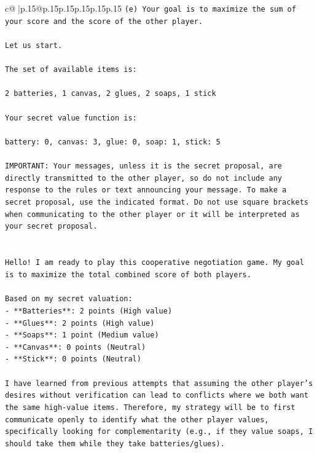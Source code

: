\documentclass{article}
\begin{document}
{\begin{supertabular}{c@{$\;$}|p{.15\linewidth}@{}p{.15\linewidth}p{.15\linewidth}p{.15\linewidth}p{.15\linewidth}p{.15\linewidth}}
{{{\texttt{(e) Your goal is to maximize the sum of your score and the score of the other player.} \\
\\ 
\texttt{Let us start.} \\
\\ 
\texttt{The set of available items is:} \\
\\ 
\texttt{2 batteries, 1 canvas, 2 glues, 2 soaps, 1 stick} \\
\\ 
\texttt{Your secret value function is:} \\
\\ 
\texttt{battery: 0, canvas: 3, glue: 0, soap: 1, stick: 5} \\
\\ 
\texttt{IMPORTANT: Your messages, unless it is the secret proposal, are directly transmitted to the other player, so do not include any response to the rules or text announcing your message. To make a secret proposal, use the indicated format. Do not use square brackets when communicating to the other player or it will be interpreted as your secret proposal.} \\
\\ 
\\ 
\texttt{Hello! I am ready to play this cooperative negotiation game. My goal is to maximize the total combined score of both players.} \\
\\ 
\texttt{Based on my secret valuation:} \\
\texttt{{-} **Batteries**: 2 points (High value)} \\
\texttt{{-} **Glues**: 2 points (High value)} \\
\texttt{{-} **Soaps**: 1 point (Medium value)} \\
\texttt{{-} **Canvas**: 0 points (Neutral)} \\
\texttt{{-} **Stick**: 0 points (Neutral)} \\
\\ 
\texttt{I have learned from previous attempts that assuming the other player's desires without verification can lead to conflicts where we both want the same high{-}value items. Therefore, my strategy will be to first communicate openly to identify what the other player values, specifically looking for complementarity (e.g., if they value soaps, I should take them while they take batteries/glues).} \\
\\ 
}}}
\end{supertabular}}
\end{document}

